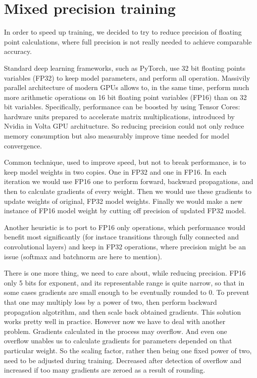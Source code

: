 \documentclass[licencjacka,en]{pracamgr}
\begin{document}
\section{Mixed precision training}
In order to speed up training, we decided to try to reduce precision of floating point calculations, where full precision is not really needed to achieve comparable accuracy.

Standard deep learning frameworks, such as PyTorch, use 32 bit floating points variables (FP32) to keep model parameters, and perform all operation. Massivily parallel architecture of modern GPUs allows to, in the same time, perform much more arithmetic operations on 16 bit floating point variables (FP16) than on 32 bit variables. 
Specifically, performance can be boosted by using Tensor Cores: hardware units prepared to accelerate matrix multiplications, introduced by Nvidia in Volta GPU architucture. \cite{MPT}
So reducing precision could not only reduce memory consumption but also measurably improve time needed for model convergence.

Common technique, used to improve speed, but not to break performance, is to keep model weights in two copies. One in FP32 and one in FP16. In each iteration we would use FP16 one to perform forward, backward propagations, and then to calculate gradients of every weight. Then we would use these gradients to update weights of original, FP32 model weights. Finally we would make a new instance of FP16 model weight by cutting off precision of updated FP32 model. \cite{APEX}

Another heuristic is to port to FP16 only operations, which performance would benefit most significantly (for instace transitions through fully connected and convolutional layers) and keep in FP32 operations, where precision might be an issue (softmax and batchnorm are here to mention). \cite{APEX}

There is one more thing, we need to care about, while reducing precision. FP16 only 5 bits for exponent, and its representable range is quite narrow, so that in some cases gradients are small enough to be eventually rounded to 0. To prevent that one may multiply loss by a power of two, then perform backward propagation algotrithm, and then scale back obtained gradients. This solution works pretty well in practice. However now we have to deal with another problem. Gradients calculated in the process may overflow. And even one overflow unables us to calculate gradients for parameters depended on that particular weight. So the scaling factor, rather then being one fixed power of two, need to be adjusted during training. Decreased after detection of overflow and increased if too many gradients are zeroed as a result of rounding.\cite{LOSS_SCALING}
\end{document}
